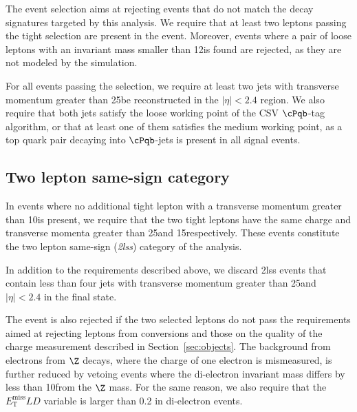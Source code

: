 The event selection aims at rejecting events that do not match the decay signatures targeted by this analysis. We require that at least two leptons passing the tight selection are present in the event. Moreover, events where a pair of loose leptons with an invariant mass smaller than 12\GeV is found are rejected, as they are not modeled by the simulation.

For all events passing the selection, we require at least two jets with transverse momentum greater than 25\GeV be reconstructed in the $|\eta|<2.4$ region.
We also require that both jets satisfy the loose working point of the CSV $\cPqb$-tag algorithm, or that at least one of them satisfies the medium working point,
as a top quark pair decaying into $\cPqb$-jets is present in all signal events.

\subsection{Two lepton same-sign category}

In events where no additional tight lepton with a transverse momentum greater than 10\GeV is present, we require that the two tight leptons have the same charge and transverse momenta greater than 25\GeV and 15\GeV respectively. These events constitute the two lepton same-sign (\textit{2lss}) category of the analysis. %

In addition to the requirements described above, we discard 2lss events that contain less than four jets with transverse momentum greater than 25\GeV and $|\eta|<2.4$ in the final state.

The event is also rejected if the two selected leptons do not pass the requirements aimed at rejecting leptons from conversions and those on the quality of the charge measurement described in Section~\ref{sec:objects}.
The background from electrons from $\Z$ decays, where the charge of one electron is mismeasured, is further reduced by vetoing events where the di-electron invariant mass differs by less than 10\GeV from the $\Z$ mass. For the same reason, we also require that the $E_\mathrm{T}^\mathrm{miss}LD$ variable is larger than 0.2 in di-electron events. 

